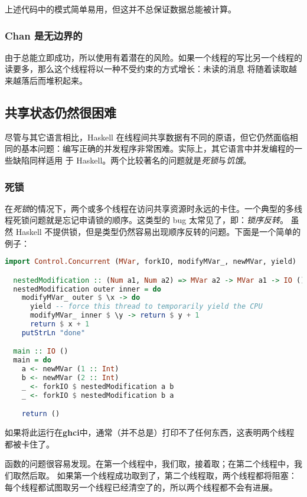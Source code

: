 \documentclass[./main.tex]{subfiles}
\begin{document}
上述代码中的\acode{!}模式简单易用，但这并不总保证数据总能被计算。

\subsubsection*{Chan 是无边界的}

由于总能立即成功，所以使用有着潜在的风险。如果一个线程的写比另一个线程的读要多，那么这个线程将以一种不受约束的方式增长：未读的消息
将随着读取越来越落后而堆积起来。

\subsection*{共享状态仍然很困难}

尽管与其它语言相比，Haskell 在线程间共享数据有不同的原语，但它仍然面临相同的基本问题：编写正确的并发程序非常困难。实际上，其它语言中并发编程的一些缺陷同样适用
于 Haskell。两个比较著名的问题就是\textit{死锁}与\textit{饥饿}。

\subsubsection*{死锁}

在\textit{死锁}的情况下，两个或多个线程在访问共享资源时永远的卡住。一个典型的多线程死锁问题就是忘记申请锁的顺序。这类型的 bug 太常见了，即：\textit{锁序反转}。
虽然 Haskell 不提供锁，但是类型仍然容易出现顺序反转的问题。下面是一个简单的例子：

\begin{lstlisting}[language=Haskell]
  import Control.Concurrent (MVar, forkIO, modifyMVar_, newMVar, yield)

  nestedModification :: (Num a1, Num a2) => MVar a2 -> MVar a1 -> IO ()
  nestedModification outer inner = do
    modifyMVar_ outer $ \x -> do
      yield -- force this thread to temporarily yield the CPU
      modifyMVar_ inner $ \y -> return $ y + 1
      return $ x + 1
    putStrLn "done"

  main :: IO ()
  main = do
    a <- newMVar (1 :: Int)
    b <- newMVar (2 :: Int)
    _ <- forkIO $ nestedModification a b
    _ <- forkIO $ nestedModification b a

    return ()
\end{lstlisting}

如果将此运行在\textbf{ghci}中，通常（并不总是）打印不了任何东西，这表明两个线程都被卡住了。

函数的问题很容易发现。在第一个线程中，我们取，接着取；在第二个线程中，我们取然后取。
如果第一个线程成功取到了，第二个线程取，两个线程都将阻塞：每个线程都试图取另一个线程已经清空了的，所以两个线程都不会有进展。
\end{document}
